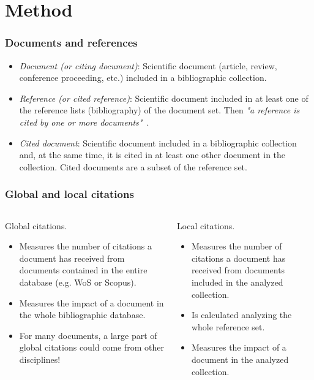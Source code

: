 \documentclass[aspectratio=169]{beamer}
\begin{document}
\section{Method}


\begin{frame}
	\frametitle{Documents and references}
	\begin{itemize}
		\item \emph{Document (or citing document)}: Scientific document 
            (article, review, conference proceeding, etc.) included in a 
            bibliographic collection.
		\item \emph{Reference (or cited reference)}: Scientific document 
            included in at least one of the reference lists (bibliography) of 
            the document set. Then \emph{"a reference is cited by one or more 
            documents"}~\cite{aria2017}.
		\item \emph{Cited document}: Scientific document included in a
		      bibliographic collection and, at the same time, it is cited in at 
              least one other document in the collection. Cited documents are a 
              subset of the reference set.
	\end{itemize}
\end{frame}

\begin{frame}
	\frametitle{Global and local citations}
	\begin{columns}
		\begin{column}{0.5\textwidth}
			Global citations.
			\begin{itemize}
				\item Measures the number of citations a document has received 
                    from documents contained in the entire database (e.g. WoS 
                    or Scopus).
				\item Measures the impact of a document in the whole 
                    bibliographic database.
				\item For many documents, a large part of global citations 
                    could come from other disciplines!
			\end{itemize}
		\end{column}
		\begin{column}{0.5\textwidth}
			Local citations.
			\begin{itemize}
				\item Measures the number of citations a document has received 
                    from documents included in the analyzed collection.
				\item Is calculated analyzing the whole reference set.
				\item Measures the impact of a document in the analyzed 
                    collection.
			\end{itemize}
		\end{column}
	\end{columns}
\end{frame}
\end{document}

